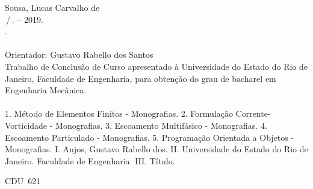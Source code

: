 \begin{titlepage}
\begin{center}
\begin{boxedminipage}{140mm}
{\begin{minipage}[top]{115mm}
		Sousa, Lucas Carvalho de\\
		\phantom{XX}\mainTitle\,/\,\authorName. -- 2019.\\
		\phantom{XX}\numPages.\\
		\phantom{XX}\\
		\phantom{XX}Orientador: Gustavo Rabello dos Santos\\ \hspace*{5mm}
       		\phantom{XX}Trabalho de Conclusão de Curso apresentado à Universidade do Estado do Rio de Janeiro, Faculdade de Engenharia, para obtenção do grau de bacharel em Engenharia Mecânica.\\
		\phantom{XX}\\
		\phantom{XX}1. Método de Elementos Finitos - Monografias. 2. Formulação Corrente-Vorticidade - Monografias. 3. Escoamento Multifásico - Monografias. 4. Escoamento Particulado - Monografias. 5. Programação Orientada a Objetos - Monografias. I. Anjos, Gustavo Rabello dos. II. Universidade do Estado do Rio de Janeiro. Faculdade de Engenharia. III. Título.
	\end{minipage}}
	\vspace*{5mm}
	\begin{flushright}
	 CDU~621
	\end{flushright}
    \vspace{1mm}
	\end{boxedminipage}\\
	\end{center}
%
\end{titlepage}
